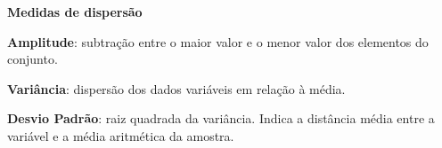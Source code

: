 \begin{multicols*}{2}
    \textbf{Medidas de dispersão}

    \textbf{Amplitude}: subtração entre o maior valor e o menor valor dos elementos do conjunto.

    \textbf{Variância}: dispersão dos dados variáveis em relação à média.

    \textbf{Desvio Padrão}: raiz quadrada da variância. Indica a distância média entre a variável e a média aritmética da amostra.














\end{multicols*}